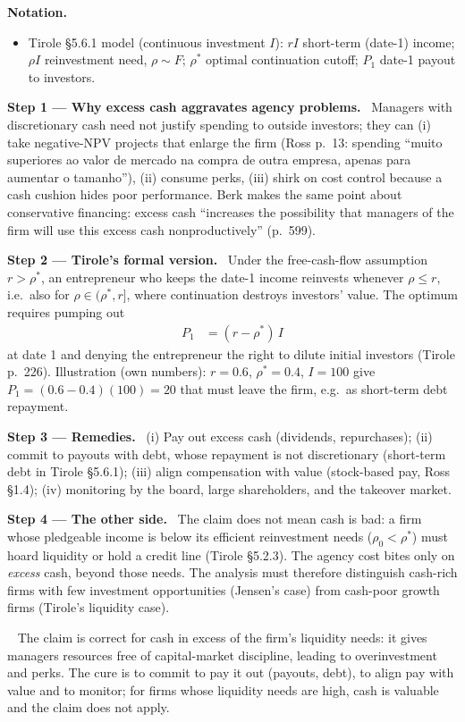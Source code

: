 \documentclass[11pt,a4paper]{article}
\newcommand{\notation}{\par\noindent\textbf{Notation.}}
\newcommand{\step}[2]{\par\medskip\noindent\textbf{Step #1 --- #2.}~}
\newcommand{\answer}[1]{\par\smallskip\noindent\fbox{\textbf{Answer #1.}}~}
\begin{document}
\notation
\begin{itemize}
  \item Tirole \S 5.6.1 model (continuous investment $I$): $rI$ short-term (date-1) income; $\rho I$ reinvestment need, $\rho\sim F$; $\rho^*$ optimal continuation cutoff; $P_1$ date-1 payout to investors.
\end{itemize}

\step{1}{Why excess cash aggravates agency problems} Managers with discretionary cash need not justify spending to outside investors; they can (i) take negative-NPV projects that enlarge the firm (Ross p.~13: spending ``muito superiores ao valor de mercado na compra de outra empresa, apenas para aumentar o tamanho''), (ii) consume perks, (iii) shirk on cost control because a cash cushion hides poor performance. Berk makes the same point about conservative financing: excess cash ``increases the possibility that managers of the firm will use this excess cash nonproductively'' (p.~599).

\step{2}{Tirole's formal version} Under the free-cash-flow assumption $r>\rho^*$, an entrepreneur who keeps the date-1 income reinvests whenever $\rho\le r$, i.e.\ also for $\rho\in(\rho^*,r]$, where continuation destroys investors' value. The optimum requires pumping out
\begin{align}
  P_1 &= (r-\rho^*)\,I \label{r6e2-P1}
\end{align}
at date 1 and denying the entrepreneur the right to dilute initial investors (Tirole p.~226). Illustration (own numbers): $r=0.6$, $\rho^*=0.4$, $I=100$ give $P_1=(0.6-0.4)(100)=20$ that must leave the firm, e.g.\ as short-term debt repayment.

\step{3}{Remedies} (i) Pay out excess cash (dividends, repurchases); (ii) commit to payouts with debt, whose repayment is not discretionary (short-term debt in Tirole \S 5.6.1); (iii) align compensation with value (stock-based pay, Ross \S 1.4); (iv) monitoring by the board, large shareholders, and the takeover market.

\step{4}{The other side} The claim does not mean cash is bad: a firm whose pledgeable income is below its efficient reinvestment needs ($\rho_0<\rho^*$) must hoard liquidity or hold a credit line (Tirole \S 5.2.3). The agency cost bites only on \emph{excess} cash, beyond those needs. The analysis must therefore distinguish cash-rich firms with few investment opportunities (Jensen's case) from cash-poor growth firms (Tirole's liquidity case).

\answer{\unskip} The claim is correct for cash in excess of the firm's liquidity needs: it gives managers resources free of capital-market discipline, leading to overinvestment and perks. The cure is to commit to pay it out (payouts, debt), to align pay with value and to monitor; for firms whose liquidity needs are high, cash is valuable and the claim does not apply.
\end{document}
